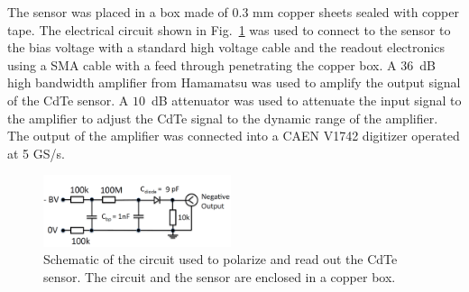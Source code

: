 %
The sensor was placed in a box made of 0.3 mm copper sheets sealed with copper tape. 
The electrical circuit shown in Fig.~\ref{fig:cdtecircuit} was used to connect to the sensor to the bias 
voltage with a standard high voltage cable and the readout electronics using a SMA cable with a feed 
through penetrating the copper box.
A $36$~dB high bandwidth amplifier from Hamamatsu was used to amplify the output signal of the CdTe sensor.
A $10$~dB attenuator was used to attenuate the input signal to the amplifier to adjust the CdTe signal 
to the dynamic range of the amplifier. The output of the amplifier was connected into a 
CAEN V1742 digitizer operated at 5 GS/s.
%
\begin{figure}[htbp] 
\centering
\includegraphics[width=0.49\textwidth]{figures/circuit_CdTe.png} 
\caption{Schematic of the circuit used to polarize and read out the 
CdTe sensor. The circuit and the sensor are enclosed in a copper box.} 
\label{fig:cdtecircuit} 
\end{figure} 
%

